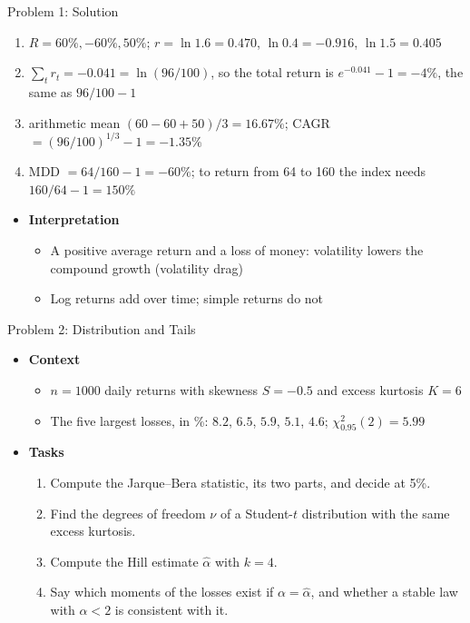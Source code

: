 \begin{frame}{Problem 1: Solution}
\itemsize{\footnotesize}
\begin{enumerate}
    \item $R = 60\%, -60\%, 50\%$; $r = \ln 1.6 = 0.470$, $\ln 0.4 = -0.916$, $\ln 1.5 = 0.405$
    \item $\sum_t r_t = -0.041 = \ln(96/100)$, so the total return is $e^{-0.041} - 1 = -4\%$, the same as $96/100 - 1$
    \item arithmetic mean $(60 - 60 + 50)/3 = 16.67\%$; CAGR $= (96/100)^{1/3} - 1 = -1.35\%$
    \item MDD $= 64/160 - 1 = -60\%$; to return from 64 to 160 the index needs $160/64 - 1 = 150\%$
\end{enumerate}
\begin{itemize}
    \item \textbf{Interpretation}
    \begin{itemize}
        \item A positive average return and a loss of money: volatility lowers the compound growth (volatility drag)
        \item Log returns add over time; simple returns do not
    \end{itemize}
\end{itemize}
\end{frame}

\begin{frame}{Problem 2: Distribution and Tails}
\itemsize{\footnotesize}
\begin{itemize}
    \item \textbf{Context}
    \begin{itemize}
        \item $n = 1000$ daily returns with skewness $S = -0.5$ and excess kurtosis $K = 6$
        \item The five largest losses, in \%: $8.2$, $6.5$, $5.9$, $5.1$, $4.6$; $\chi^2_{0.95}(2) = 5.99$
    \end{itemize}
    \item \textbf{Tasks}
\begin{enumerate}
    \item Compute the Jarque--Bera statistic, its two parts, and decide at 5\%.
    \item Find the degrees of freedom $\nu$ of a Student-$t$ distribution with the same excess kurtosis.
    \item Compute the Hill estimate $\hat\alpha$ with $k = 4$.
    \item Say which moments of the losses exist if $\alpha = \hat\alpha$, and whether a stable law with $\alpha < 2$ is consistent with it.
\end{enumerate}
\end{itemize}
\end{frame}

